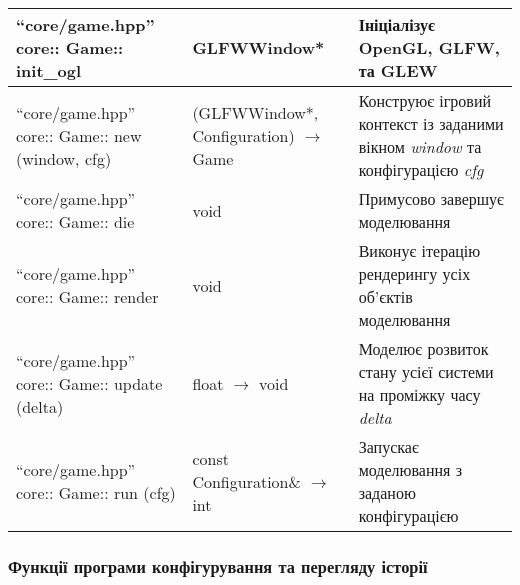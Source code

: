 \begin{longtable}{| C{6cm} | C{4cm} | C{5cm} |}
  \hline
  ``core/game.hpp'' \newline core:: \newline Game:: \newline
  init_ogl
  & GLFWWindow*
  & Ініціалізує OpenGL, GLFW, та GLEW \\
  \hline
  ``core/game.hpp'' \newline core:: \newline Game:: \newline
  new \newline (window, cfg)
  & (GLFWWindow*, Configuration) $\to$ Game
  & Конструює ігровий контекст із заданими вікном \emph{window}
  та конфігурацією \emph{cfg} \\
  \hline
  ``core/game.hpp'' \newline core:: \newline Game:: \newline
  die
  & void
  & Примусово завершує моделювання \\
  \hline
  ``core/game.hpp'' \newline core:: \newline Game:: \newline
  render
  & void
  & Виконує ітерацію рендерингу усіх об'єктів моделювання \\
  \hline
  ``core/game.hpp'' \newline core:: \newline Game:: \newline
  update \newline (delta)
  & float $\to$ void
  & Моделює розвиток стану усієї системи на проміжку часу \emph{delta} \\
  \hline
  ``core/game.hpp'' \newline core:: \newline Game:: \newline
  run \newline (cfg)
  & const Configuration\& $\to$ int
  & Запускає моделювання з заданою конфігурацією \\
  \hline
\end{longtable}\normalsize
\newpage
\subsubsection{Функції програми конфігурування та перегляду історії}

